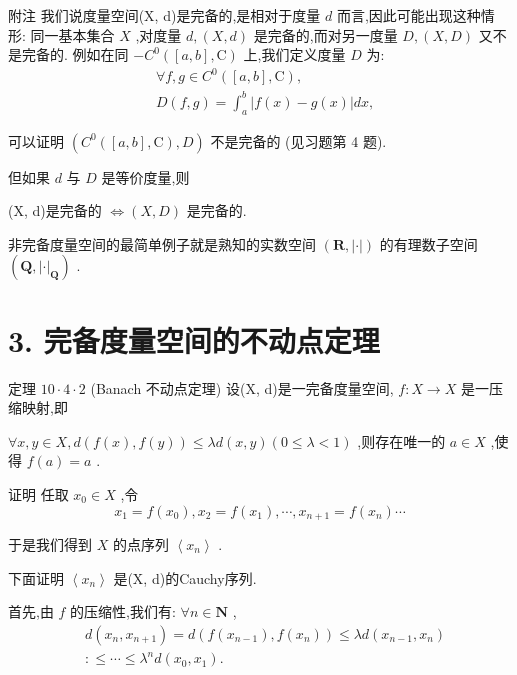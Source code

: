附注 我们说度量空间(X, d)是完备的,是相对于度量 $d$ 而言,因此可能出现这种情形: 同一基本集合 $X$ ,对度量 $d,\left( {X,d}\right)$ 是完备的,而对另一度量 $D,\left( {X,D}\right)$ 又不是完备的. 例如在同 $- {C}^{0}\left( {\left\lbrack  {a,b}\right\rbrack  ,\mathrm{C}}\right)$ 上,我们定义度量 $D$ 为:
\begin{align*}
	&\forall f,g \in  {C}^{0}\left( {\left\lbrack  {a,b}\right\rbrack  ,\mathrm{C}}\right) ,\\
	&D\left( {f,g}\right)  = {\int }_{a}^{b}\left| {f\left( x\right)  - g\left( x\right) }\right| {dx},
\end{align*}

可以证明 $\left( {{C}^{0}\left( {\left\lbrack  {a,b}\right\rbrack  ,\mathrm{C}}\right) ,D}\right)$ 不是完备的 (见习题第 4 题).

但如果 $d$ 与 $D$ 是等价度量,则

(X, d)是完备的 $\Leftrightarrow  \left( {X,D}\right)$ 是完备的.

非完备度量空间的最简单例子就是熟知的实数空间 $\left( {\mathbf{R},\left| \cdot \right| }\right)$ 的有理数子空间 $\left( {\mathbf{Q},{\left| \cdot \right| }_{\mathbf{Q}}}\right)$ .

\section*{3. 完备度量空间的不动点定理}

定理 ${10} \cdot  4 \cdot  2$ (Banach 不动点定理) 设(X, d)是一完备度量空间, $f : X \rightarrow  X$ 是一压缩映射,即

$\forall x,y \in  X,d\left( {f\left( x\right) ,f\left( y\right) }\right)  \leq  {\lambda d}\left( {x,y}\right) \left( {0 \leq  \lambda  < 1}\right)$ ,则存在唯一的 $a \in  X$ ,使得 $f\left( a\right)  = a$ .

证明 任取 ${x}_{0} \in  X$ ,令
$${x}_{1} = f\left( {x}_{0}\right) ,{x}_{2} = f\left( {x}_{1}\right) ,\cdots ,{x}_{n + 1} = f\left( {x}_{n}\right) \cdots$$

于是我们得到 $X$ 的点序列 $\left\langle  {x}_{n}\right\rangle$ .

下面证明 $\left\langle  {x}_{n}\right\rangle$ 是(X, d)的Cauchy序列.

首先,由 $f$ 的压缩性,我们有: $\forall n \in  \mathbf{N}$ ,
\begin{align*}
	&d\left( {{x}_{n},{x}_{n + 1}}\right)  = d\left( {f\left( {x}_{n - 1}\right) ,f\left( {x}_{n}\right) }\right)  \leq  {\lambda d}\left( {{x}_{n - 1},{x}_{n}}\right)\\
	&:  \leq  \cdots  \leq  {\lambda }^{n}d\left( {{x}_{0},{x}_{1}}\right) .
\end{align*}

